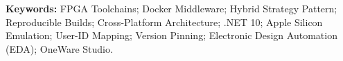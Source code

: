 
\vspace{1cm}
\textbf{Keywords:} FPGA Toolchains; Docker Middleware; Hybrid Strategy Pattern; Reproducible Builds; Cross-Platform Architecture; .NET 10; Apple Silicon Emulation; User-ID Mapping; Version Pinning; Electronic Design Automation (EDA); OneWare Studio.

